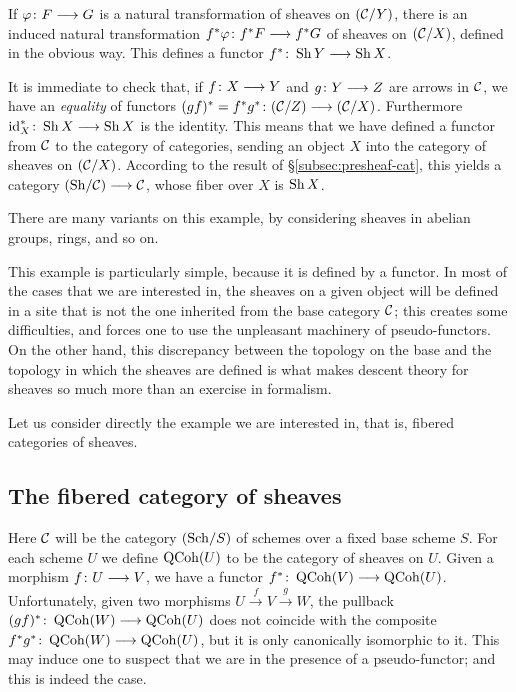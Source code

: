 \begin{3   FIBERED CATEGORIES}
\begin{3.2 Examples of fibered categories}
\begin{example}
If $\phi \colon F \arr G$ is a natural transformation of sheaves on $(\mathcal{C}/Y)$, there is an induced natural transformation $f^*\phi \colon f^*F \arr f^*G$ of sheaves on $(\mathcal{C}/X)$, defined in the obvious way. This defines a functor $f^* \colon \sh Y \arr \sh X$.

It is immediate to check that, if $f \colon X \arr Y$ and $g \colon Y \arr Z$ are arrows in $\mathcal{C}$, we have an \emph{equality} of functors $(gf)^* = f^*g^* \colon (\cC/Z) \arr (\cC/X)$. Furthermore $\id_X^* \colon \sh X \arr \sh X$ is the identity. This means that we have defined a functor from $\mathcal{C}$ to the category of categories, sending an object $X$ into the category of sheaves on $(\mathcal{C}/X)$. According to the result of \S\ref{subsec:presheaf-cat}, this yields a category $\catsh{\cC} \arr \cC$, whose fiber over $X$ is $\operatorname{Sh}{X}$.
\end{example}

There are many variants on this example, by considering sheaves in abelian groups, rings, and so on.

This example is particularly simple, because it is defined by a functor. In most of the cases that we are interested in, the sheaves on a given object will be defined in a site that is not the one inherited from the base category $\mathcal{C}$; this creates some difficulties, and forces one to use the unpleasant machinery of pseudo-functors. On the other hand, this discrepancy between the topology on the base and the topology in which the sheaves are defined is what makes descent theory for \qc sheaves so much more than an exercise in formalism.

Let us consider directly the example we are interested in, that is, fibered categories of \qc sheaves.

\subsection{The fibered category of \qc sheaves}
\label{subsec:fibered-quasi-coherent}
Here $\mathcal{C}$ will be the category $({\mathrm{Sch}/S})$ of schemes over a fixed base scheme $S$. For each scheme $U$ we define $\operatorname{QCoh}(U)$ to be the category of \qc sheaves on $U$. Given a morphism $f \colon U \arr V$, we have a functor $f^* \colon \qcoh V \arr \qcoh U$. Unfortunately, given two morphisms $U \xrightarrow{f} V \xrightarrow{g} W$, the pullback $(gf)^* \colon \qcoh W \arr \qcoh U$ does not coincide with the composite $f^*g^* \colon \qcoh W \arr \qcoh U$, but it is only  canonically isomorphic to it. This may induce one to suspect that we are in the presence of a pseudo-functor; and this is indeed the case.


\end{3.2 Examples of fibered categories}
\end{3   FIBERED CATEGORIES}
